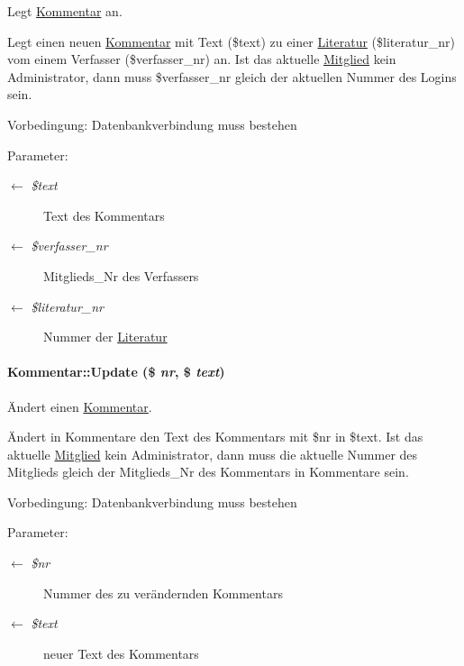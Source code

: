 Legt \hyperlink{classKommentar}{Kommentar} an. 

Legt einen neuen \hyperlink{classKommentar}{Kommentar} mit Text (\$text) zu einer \hyperlink{classLiteratur}{Literatur} (\$literatur\_\-nr) vom einem Verfasser (\$verfasser\_\-nr) an. Ist das aktuelle \hyperlink{classMitglied}{Mitglied} kein Administrator, dann muss \$verfasser\_\-nr gleich der aktuellen Nummer des Logins sein. \begin{Desc}
\item[Vorbedingung:]Datenbankverbindung muss bestehen \end{Desc}
\begin{Desc}
\item[Parameter:]
\begin{description}
\item[\mbox{$\leftarrow$} {\em \$text}]Text des Kommentars \item[\mbox{$\leftarrow$} {\em \$verfasser\_\-nr}]Mitglieds\_\-Nr des Verfassers \item[\mbox{$\leftarrow$} {\em \$literatur\_\-nr}]Nummer der \hyperlink{classLiteratur}{Literatur}\end{description}
\end{Desc}
\hypertarget{classKommentar_0b3e20e910493e67b67b747243f04511}{
\paragraph[Update]{\setlength{\rightskip}{0pt plus 5cm}Kommentar::Update (\$ {\em nr}, \$ {\em text})}\hfill}
\label{classKommentar_0b3e20e910493e67b67b747243f04511}


Ändert einen \hyperlink{classKommentar}{Kommentar}. 

Ändert in Kommentare den Text des Kommentars mit \$nr in \$text. Ist das aktuelle \hyperlink{classMitglied}{Mitglied} kein Administrator, dann muss die aktuelle Nummer des Mitglieds gleich der Mitglieds\_\-Nr des Kommentars in Kommentare sein. \begin{Desc}
\item[Vorbedingung:]Datenbankverbindung muss bestehen \end{Desc}
\begin{Desc}
\item[Parameter:]
\begin{description}
\item[\mbox{$\leftarrow$} {\em \$nr}]Nummer des zu verändernden Kommentars \item[\mbox{$\leftarrow$} {\em \$text}]neuer Text des Kommentars\end{description}
\end{Desc}


